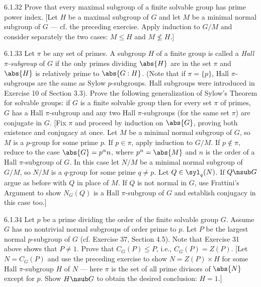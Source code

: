 \begin{exercise}{6.1.32}
    Prove that every maximal subgroup of a finite solvable group has prime power index.
    [Let $H$ be a maximal subgroup of $G$ and let $M$ be a minimal normal subgroup of $G$ — cf. the preceding exercise.
    Apply induction to $G/M$ and consider separately the two cases: $M \leq H$ and $M \not\leq H$.]
\end{exercise}

\begin{exercise}{6.1.33}
    Let $\pi$ be any set of primes.
    A subgroup $H$ of a finite group is called a \emph{Hall $\pi$-subgroup} of $G$ if the only primes dividing $\abs{H}$ are in the set $\pi$ and $\abs{H}$ is relatively prime to $\abs{G:H}$.
    (Note that if $\pi = \{p\}$, Hall $\pi$-subgroups are the same as Sylow $p$-subgroups. Hall subgroups were introduced in Exercise 10 of Section 3.3).
    Prove the following generalization of Sylow's Theorem for solvable groups: if $G$ is a finite solvable group then for every set $\pi$ of primes, $G$ has a Hall $\pi$-subgroup and any two Hall $\pi$-subgroups (for the same set $\pi$) are conjugate in $G$.
    [Fix $\pi$ and proceed by induction on $\abs{G}$, proving both existence and conjugacy at once.
    Let $M$ be a minimal normal subgroup of $G$, so $M$ is a $p$-group for some prime $p$.
    If $p \in \pi$, apply induction to $G/M$.
    If $p \notin \pi$, reduce to the case $\abs{G} = p^\alpha n$, where $p^\alpha = \abs{M}$ and $n$ is the order of a Hall $\pi$-subgroup of $G$.
    In this case let $N/M$ be a minimal normal subgroup of $G/M$, so $N/M$ is a $q$-group for some prime $q \neq p$.
    Let $Q \in \syl_q(N)$.
    If $Q \nsub G$ argue as before with $Q$ in place of $M$.
    If $Q$ is not normal in $G$, use Frattini's Argument to show $N_G(Q)$ is a Hall $\pi$-subgroup of $G$ and establish conjugacy in this case too.]
\end{exercise}

\begin{exercise}{6.1.34}
    Let $p$ be a prime dividing the order of the finite solvable group $G$.
    Assume $G$ has no nontrivial normal subgroups of order prime to $p$.
    Let $P$ be the largest normal $p$-subgroup of $G$ (cf. Exercise 37, Section 4.5).
    Note that Exercise 31 above shows that $P \neq 1$.
    Prove that $C_G(P) \leq P$, i.e., $C_G(P) = Z(P)$.
    [Let $N = C_G(P)$ and use the preceding exercise to show $N = Z(P) \times H$ for some Hall $\pi$-subgroup $H$ of $N$ — here $\pi$ is the set of all prime divisors of $\abs{N}$ except for $p$.
    Show $H \nsub G$ to obtain the desired conclusion: $H = 1$.]
\end{exercise}


